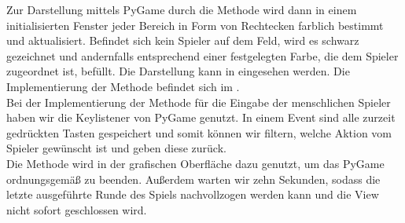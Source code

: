 Zur Darstellung mittels PyGame durch die Methode  wird dann in einem initialisierten Fenster
jeder Bereich in Form von Rechtecken farblich bestimmt und aktualisiert.
Befindet sich kein Spieler auf dem Feld, wird es schwarz gezeichnet und andernfalls entsprechend einer festgelegten
Farbe, die dem Spieler zugeordnet ist, befüllt.
Die Darstellung kann in  eingesehen werden.
Die Implementierung der Methode befindet sich im . \\

Bei der Implementierung der Methode  für die Eingabe der menschlichen Spieler haben wir die
Keylistener von PyGame genutzt.
In einem Event sind alle zurzeit gedrückten Tasten gespeichert und somit können wir filtern, welche Aktion vom Spieler
gewünscht ist und geben diese zurück. \\

Die Methode  wird in der grafischen Oberfläche dazu genutzt, um das PyGame ordnungsgemäß zu beenden.
Außerdem warten wir zehn Sekunden, sodass die letzte ausgeführte Runde des Spiels nachvollzogen werden kann und die
View nicht sofort geschlossen wird.
